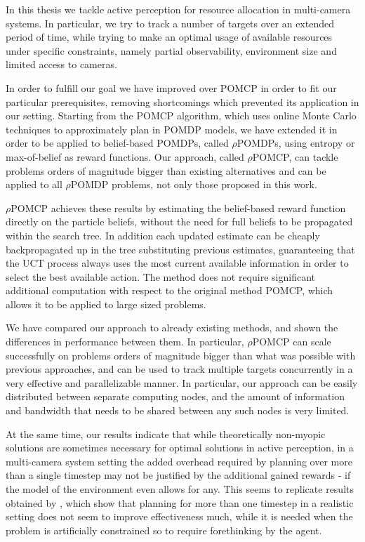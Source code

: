 In this thesis we tackle active perception for resource allocation in multi-camera systems. In
particular, we try to track a number of targets over an extended period of time, while trying to
make an optimal usage of available resources under specific constraints, namely partial
observability, environment size and limited access to cameras.

In order to fulfill our goal we have improved over POMCP \cite{cit:pomcp} in order to fit our
particular prerequisites, removing shortcomings which prevented its application in our setting.
Starting from the POMCP algorithm, which uses online Monte Carlo techniques to approximately plan in
POMDP models, we have extended it in order to be applied to belief-based POMDPs, called
$\rho$POMDPs, using entropy or max-of-belief as reward functions. Our approach, called $\rho$POMCP,
can tackle problems orders of magnitude bigger than existing alternatives and can be applied to all
$\rho$POMDP problems, not only those proposed in this work.

$\rho$POMCP achieves these results by estimating the belief-based reward function directly on the
particle beliefs, without the need for full beliefs to be propagated within the search tree. In
addition each updated estimate can be cheaply backpropagated up in the tree substituting previous
estimates, guaranteeing that the UCT process always uses the most current available information in
order to select the best available action. The method does not require significant additional
computation with respect to the original method POMCP, which allows it to be applied to large sized
problems.

We have compared our approach to already existing methods, and shown the differences in performance
between them. In particular, $\rho$POMCP can scale successfully on problems orders of magnitude
bigger than what was possible with previous approaches, and can be used to track multiple targets
concurrently in a very effective and parallelizable manner. In particular, our approach can be
easily distributed between separate computing nodes, and the amount of information and bandwidth
that needs to be shared between any such nodes is very limited.

At the same time, our results indicate that while theoretically non-myopic solutions are sometimes
necessary for optimal solutions in active perception, in a multi-camera system setting the added
overhead required by planning over more than a single timestep may not be justified by the
additional gained rewards - if the model of the environment even allows for any. This seems to
replicate results obtained by \cite{cit:relworktanks}, which show that planning for more than one
timestep in a realistic setting does not seem to improve effectiveness much, while it is needed when
the problem is artificially constrained so to require forethinking by the agent.

